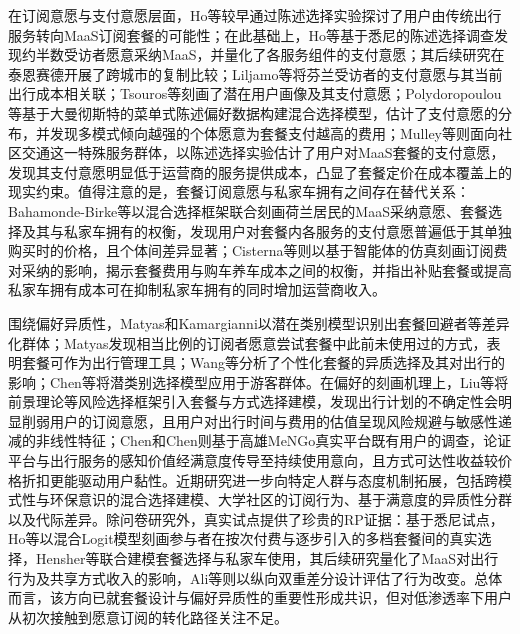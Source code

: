 在订阅意愿与支付意愿层面，Ho等\citep{hoProspectsSwitchingOut2017}较早通过陈述选择实验探讨了用户由传统出行服务转向MaaS订阅套餐的可能性；在此基础上，Ho等\citep{hoPotentialUptakeWillingnesstopay2018}基于悉尼的陈述选择调查发现约半数受访者愿意采纳MaaS，并量化了各服务组件的支付意愿；其后续研究在泰恩赛德开展了跨城市的复制比较\citep{hoPublicPreferencesMobility2020}；Liljamo等\citep{liljamoPeopleCurrentMobility2020}将芬兰受访者的支付意愿与其当前出行成本相关联；Tsouros等\citep{tsourosMaaSUsersWho2021}刻画了潜在用户画像及其支付意愿；Polydoropoulou等\citep{polydoropoulouExploringIndividualPreferences2020}基于大曼彻斯特的菜单式陈述偏好数据构建混合选择模型，估计了支付意愿的分布，并发现多模式倾向越强的个体愿意为套餐支付越高的费用；Mulley等\citep{mulleyMobilityServiceCommunity2020}则面向社区交通这一特殊服务群体，以陈述选择实验估计了用户对MaaS套餐的支付意愿，发现其支付意愿明显低于运营商的服务提供成本，凸显了套餐定价在成本覆盖上的现实约束。值得注意的是，套餐订阅意愿与私家车拥有之间存在替代关系：Bahamonde-Birke等\citep{bahamonde-birkeAmWillingReplace2023}以混合选择框架联合刻画荷兰居民的MaaS采纳意愿、套餐选择及其与私家车拥有的权衡，发现用户对套餐内各服务的支付意愿普遍低于其单独购买时的价格，且个体间差异显著；Cisterna等\citep{cisternaAssessingWillingnessPay2024}则以基于智能体的仿真刻画订阅费对采纳的影响，揭示套餐费用与购车养车成本之间的权衡，并指出补贴套餐或提高私家车拥有成本可在抑制私家车拥有的同时增加运营商收入。

围绕偏好异质性，Matyas和Kamargianni\citep{matyasInvestigatingHeterogeneityPreferences2021}以潜在类别模型识别出套餐回避者等差异化群体；Matyas\citep{matyasPotentialMobilityService2019}发现相当比例的订阅者愿意尝试套餐中此前未使用过的方式，表明套餐可作为出行管理工具；Wang等\citep{wangHeterogeneousChoicePersonalized2024}分析了个性化套餐的异质选择及其对出行的影响；Chen等\citep{chenExploringTouristPreference2023}将潜类别选择模型应用于游客群体。在偏好的刻画机理上，Liu等\citep{liuRiskyChoiceDiminishing2024}将前景理论等风险选择框架引入套餐与方式选择建模，发现出行计划的不确定性会明显削弱用户的订阅意愿，且用户对出行时间与费用的估值呈现风险规避与敏感性递减的非线性特征；Chen和Chen\citep{chenInvestigatingEffectsPlatform2023}则基于高雄MeNGo真实平台既有用户的调查，论证平台与出行服务的感知价值经满意度传导至持续使用意向，且方式可达性收益较价格折扣更能驱动用户黏性。近期研究进一步向特定人群与态度机制拓展，包括跨模式性与环保意识的混合选择建模\citep{kriswardhanaRoleIntermodalityEnvironmental2025}、大学社区的订阅行为\citep{coppolaMobilityServiceMaaS2025,silvestriMobilityServiceMaaS2025}、基于满意度的异质性分群\citep{chenInvestigatingUnobservedHeterogeneity2025}以及代际差异\citep{kriswardhanaGenerationalDifferencesPreferences2025}。除问卷研究外，真实试点提供了珍贵的RP证据：基于悉尼试点，Ho等\citep{hoDriversParticipantsChoices2021}以混合Logit模型刻画参与者在按次付费与逐步引入的多档套餐间的真实选择，Hensher等\citep{hensherMobilityServicePrivate2021}联合建模套餐选择与私家车使用，其后续研究量化了MaaS对出行行为及共享方式收入的影响\citep{hoCanMaaSChange2021}，Ali等\citep{aliMonitoringEvaluationTravel2025}则以纵向双重差分设计评估了行为改变。总体而言，该方向已就套餐设计与偏好异质性的重要性形成共识，但对低渗透率下用户从初次接触到愿意订阅的转化路径关注不足。

